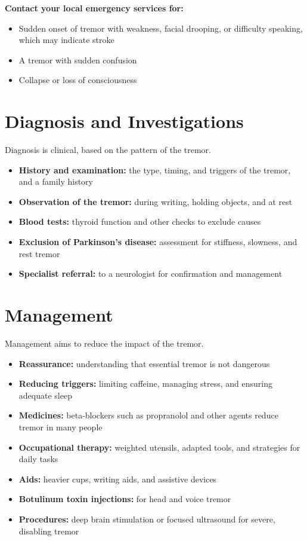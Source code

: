 \textbf{Contact your local emergency services for:}
\begin{itemize}
    \item Sudden onset of tremor with weakness, facial drooping, or difficulty speaking, which may indicate stroke
    \item A tremor with sudden confusion
    \item Collapse or loss of consciousness
\end{itemize}

\section*{Diagnosis and Investigations}
Diagnosis is clinical, based on the pattern of the tremor.
\begin{itemize}
    \item \textbf{History and examination:} the type, timing, and triggers of the tremor, and a family history
    \item \textbf{Observation of the tremor:} during writing, holding objects, and at rest
    \item \textbf{Blood tests:} thyroid function and other checks to exclude causes
    \item \textbf{Exclusion of Parkinson's disease:} assessment for stiffness, slowness, and rest tremor
    \item \textbf{Specialist referral:} to a neurologist for confirmation and management
\end{itemize}

\section*{Management}
Management aims to reduce the impact of the tremor.
\begin{itemize}
    \item \textbf{Reassurance:} understanding that essential tremor is not dangerous
    \item \textbf{Reducing triggers:} limiting caffeine, managing stress, and ensuring adequate sleep
    \item \textbf{Medicines:} beta-blockers such as propranolol and other agents reduce tremor in many people
    \item \textbf{Occupational therapy:} weighted utensils, adapted tools, and strategies for daily tasks
    \item \textbf{Aids:} heavier cups, writing aids, and assistive devices
    \item \textbf{Botulinum toxin injections:} for head and voice tremor
    \item \textbf{Procedures:} deep brain stimulation or focused ultrasound for severe, disabling tremor
\end{itemize}

